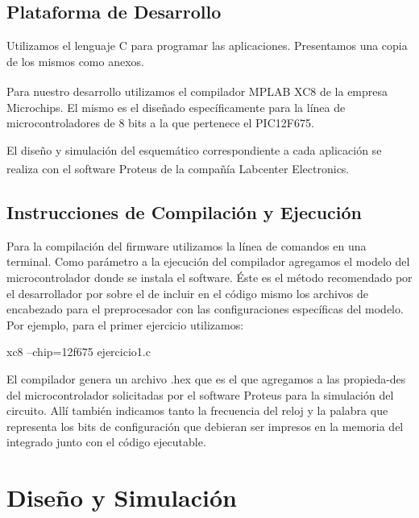 \documentclass[a4paper]{article}
\let\originalcite\cite
\renewcommand{\cite}[2][]{\textsuperscript{\originalcite{#2}}}
\begin{document}
\subsection{Plataforma de Desarrollo}

Utilizamos el lenguaje C para programar las aplicaciones. Presentamos
una copia de los mismos como anexos.

Para nuestro desarrollo utilizamos el compilador MPLAB 
XC8\cite{bib:compilador} de la empresa Microchips. El mismo es el 
diseñado específicamente para la línea de microcontroladores de 8 bits
a la que pertenece el PIC12F675.

El diseño y simulación del esquemático correspondiente a cada 
aplicación se realiza con el software Proteus\cite{bib:simulador} de 
la compañía Labcenter Electronics.

\subsection{Instrucciones de Compilación y Ejecución}

Para la compilación del firmware utilizamos la línea de comandos en 
una terminal. Como parámetro a la ejecución del compilador agregamos
el modelo del microcontrolador donde se instala el software. Éste es 
el método recomendado por el desarrollador por sobre el de incluir en 
el código mismo los archivos de encabezado para el preprocesador con 
las configuraciones específicas del modelo. Por ejemplo, para el 
primer ejercicio utilizamos:

\begin{center}\ttfamily 
	xc8 --chip=12f675 ejercicio1.c
\end{center}

El compilador genera un archivo {\ttfamily .hex} que es el que
agregamos a las propieda-des del microcontrolador solicitadas 
por el software Proteus para la simulación del circuito. Allí también 
indicamos tanto la frecuencia del reloj y la palabra que representa 
los bits de configuración que debieran ser impresos en la memoria del
integrado junto con el código ejecutable. 

\section{Diseño y Simulación}
\end{document}
